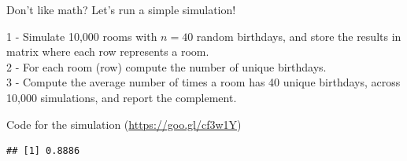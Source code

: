 \begin{frame}{Don't like math? Let's run a simple simulation!}

1 - Simulate 10,000 rooms with \(n = 40\) random birthdays, and store
the results in matrix where each row represents a room.\\
2 - For each room (row) compute the number of unique birthdays.\\
3 - Compute the average number of times a room has 40 unique birthdays,
across 10,000 simulations, and report the complement.

\end{frame}

\begin{frame}[fragile]{Code for the simulation
(\url{https://goo.gl/cf3w1Y})}

\begin{Shaded}
\begin{Highlighting}[]
\StringTok{ }
\StringTok{ }\NormalTok{(}\NormalTok{(}\OperatorTok{*}\StringTok{ }
                                 \NormalTok{, }\NormalTok{)), }
\StringTok{ }
\StringTok{ }\NormalTok{(}
\OperatorTok{==}\StringTok{ }
\StringTok{ } \OperatorTok{-}\StringTok{ }
\NormalTok{\}}
\StringTok{ }
\StringTok{ }
\end{Highlighting}
\end{Shaded}

\begin{verbatim}
## [1] 0.8886
\end{verbatim}

\end{frame}

